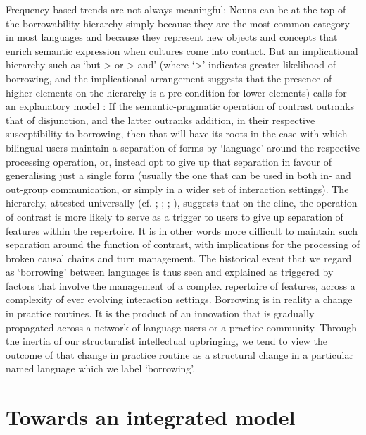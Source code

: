 \documentclass[output=paper]{langscibook}
\begin{document}
Frequency-based trends are not always meaningful: Nouns can be at the top of the borrowability hierarchy simply because they are the most common category in most languages and because they represent new objects and concepts that enrich semantic expression when cultures come into contact. But an implicational hierarchy such as ‘but > or > and’ (where ‘>’ indicates greater likelihood of borrowing, and the implicational arrangement suggests that the presence of higher elements on the hierarchy is a pre-condition for lower elements) calls for an explanatory model \citep{matras_utterance_1998}: If the semantic-pragmatic operation of contrast outranks that of disjunction, and the latter outranks addition, in their respective susceptibility to borrowing, then that will have its roots in the ease with which bilingual users maintain a separation of forms by ‘language’ around the respective processing operation, or, instead opt to give up that separation in favour of generalising just a single form (usually the one that can be used in both in- and out-group communication, or simply in a wider set of interaction settings). The hierarchy, attested universally (cf. \citealt{hober_borrowing_2022}; \citealt{stolz_pero_2021}; \citealt{grant_contact_2012}; \citealt{matras_borrowability_2007}), suggests that on the cline, the operation of contrast is more likely to serve as a trigger to users to give up separation of features within the repertoire. It is in other words more difficult to maintain such separation around the function of contrast, with implications for the processing of broken causal chains and turn management. The historical event that we regard as ‘borrowing’ between languages is thus seen and explained as triggered by factors that involve the management of a complex repertoire of features, across a complexity of ever evolving interaction settings. Borrowing is in reality a change in practice routines. It is the product of an innovation that is gradually propagated across a network of language users or a practice community. Through the inertia of our structuralist intellectual upbringing, we tend to view the outcome of that change in practice routine as a structural change in a particular named language which we label ‘borrowing’.

\section{Towards an integrated model}
\end{document}
